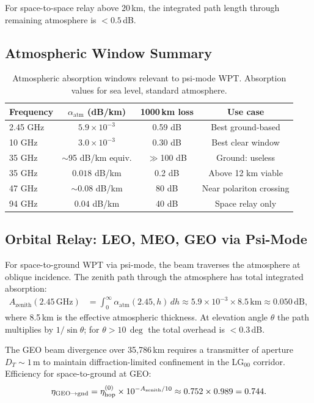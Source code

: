 \documentclass[aps,prd,twocolumn,superscriptaddress]{revtex4-2}
\newcommand{\alphaatm}{\alpha_\mathrm{atm}}
\newcommand{\etahop}{\eta_\mathrm{hop}}
\begin{document}
For space-to-space relay above 20\,km, the integrated path length
through remaining atmosphere is $< 0.5$\,dB.

\subsection{Atmospheric Window Summary}

\begin{table}[H]
\centering
\caption{Atmospheric absorption windows relevant to psi-mode WPT.
Absorption values for sea level, standard atmosphere.}
\label{tab:atm_windows}
\begin{tabular}{lccc}
\toprule
Frequency & $\alphaatm$ (dB/km) & 1000\,km loss & Use case \\
\midrule
2.45 GHz & $5.9\times10^{-3}$ & 0.59 dB & Best ground-based \\
10 GHz   & $3.0\times10^{-3}$ & 0.30 dB & Best clear window \\
35 GHz   & $\sim$95 dB/km equiv.& $\gg$100 dB & Ground: useless \\
35 GHz   & $0.018$ dB/km & 0.2 dB & Above 12 km viable \\
47 GHz   & $\sim$0.08 dB/km & 80 dB & Near polariton crossing \\
94 GHz   & $0.04$ dB/km & 40 dB & Space relay only \\
\bottomrule
\end{tabular}
\end{table}

\subsection{Orbital Relay: LEO, MEO, GEO via Psi-Mode}

For space-to-ground WPT via psi-mode, the beam traverses the atmosphere
at oblique incidence.  The zenith path through the atmosphere has total
integrated absorption:
\begin{align}
A_\mathrm{zenith}(2.45\,\mathrm{GHz})
&= \int_0^\infty \alphaatm(2.45,h)\,dh
\approx 5.9\times10^{-3}\times 8.5\,\mathrm{km} \approx 0.050\,\mathrm{dB},
\label{eq:zenith_loss}
\end{align}
where 8.5\,km is the effective atmospheric thickness.  At elevation
angle $\theta$ the path multiplies by $1/\sin\theta$; for $\theta > 10\,\deg$
the total overhead is $< 0.3$\,dB.

The GEO beam divergence over 35,786\,km requires a transmitter of
aperture $D_T \sim 1$\,m to maintain diffraction-limited confinement
in the LG$_{00}$ corridor.  Efficiency for space-to-ground at GEO:
\begin{equation}
\eta_\mathrm{GEO\to\rm gnd} = \etahop^{(0)}\times10^{-A_\mathrm{zenith}/10}
\approx 0.752\times0.989 = 0.744.
\label{eq:eta_geo}
\end{equation}
\end{document}
